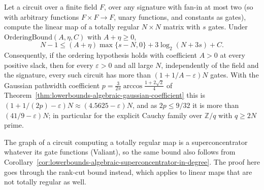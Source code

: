 \begin{theorem}
  \label{thm:lowerbounds-algebraic-totally-regular}
  \leanok
  Let a circuit over a finite field $F$, over any signature with fan-in at
  most two (so with arbitrary functions $F\times F\to F$, unary functions,
  and constants as gates), compute the linear map of a totally regular
  $N\times N$ matrix with $s$ gates. Under $\mathrm{OrderingBound}(A,\eta,C)$
  with $A+\eta\ge0$,
  \[
    N - 1 \le (A+\eta)\max\{s-N,0\} + 3\log_2(N+3s) + C .
  \]
  Consequently, if the ordering hypothesis holds with coefficient $A>0$ at
  every positive slack, then for every $\varepsilon>0$ and all large $N$,
  independently of the field and the signature, every such circuit has more
  than $(1+1/A-\varepsilon)N$ gates. With the Gaussian pathwidth
  coefficient $p=\tfrac{3}{2\pi}\arccos\tfrac{1+2\sqrt2}{4}$ of
  Theorem~\ref{thm:lowerbounds-algebraic-gaussian-coefficient} this is
  $(1+1/(2p)-\varepsilon)N\approx(4.5625-\varepsilon)N$, and as $2p\le9/32$
  it is more than $(41/9-\varepsilon)N$; in particular for the explicit
  Cauchy family over $\mathbb{Z}/q$ with $q\ge2N$ prime.

  The graph of a circuit computing a totally regular map is a
  superconcentrator whatever its gate functions (Valiant), so the same bound
  also follows from
  Corollary~\ref{cor:lowerbounds-algebraic-superconcentrator-in-degree}. The
  proof here goes through the rank-cut bound instead, which applies to linear
  maps that are not totally regular as well.
\end{theorem}
